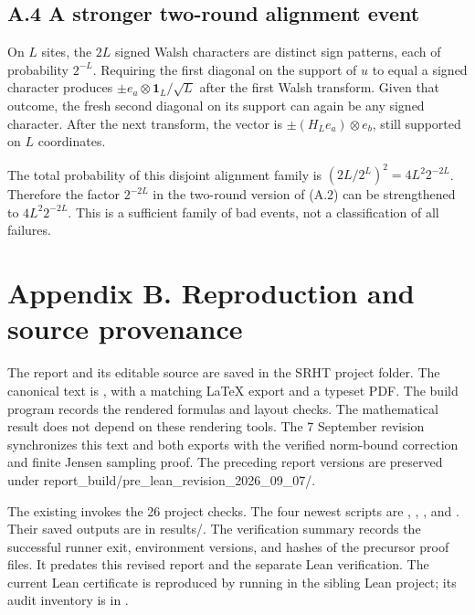 \documentclass[11pt,a4paper]{article}
\begin{document}
\subsection*{A.4 A stronger two-round alignment event}
On \(L\) sites, the \(2L\) signed Walsh characters are distinct sign patterns, each of probability \(2^{-L}\). Requiring the first diagonal on the support of \(u\) to equal a signed character produces \(\pm e_a\otimes\mathbf1_L/\sqrt L\) after the first Walsh transform. Given that outcome, the fresh second diagonal on its support can again be any signed character. After the next transform, the vector is \(\pm(H_Le_a)\otimes e_b\), still supported on \(L\) coordinates.

The total probability of this disjoint alignment family is \((2L/2^L)^2=4L^2 2^{-2L}\). Therefore the factor \(2^{-2L}\) in the two-round version of (A.2) can be strengthened to \(4L^2 2^{-2L}\). This is a sufficient family of bad events, not a classification of all failures.

\section*{Appendix B. Reproduction and source provenance}
The report and its editable source are saved in the SRHT project folder. The canonical text is , with a matching LaTeX export and a typeset PDF. The build program records the rendered formulas and layout checks. The mathematical result does not depend on these rendering tools. The 7 September revision synchronizes this text and both exports with the verified norm-bound correction and finite Jensen sampling proof. The preceding report versions are preserved under report\_build/pre\_lean\_revision\_2026\_09\_07/.

The existing  invokes the 26 project checks. The four newest scripts are , , , and . Their saved outputs are in results/. The verification summary records the successful runner exit, environment versions, and hashes of the precursor proof files. It predates this revised report and the separate Lean verification. The current Lean certificate is reproduced by running  in the sibling Lean project; its audit inventory is in .
\end{document}
